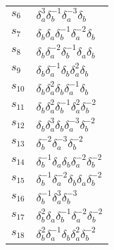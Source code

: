\documentclass{article}
\begin{document}
\begin{center}
\begin{tabular}{ll}
$s_{6}$ & $\delta_a^{3}\delta_b^{-1}\delta_a^{-3}\delta_b^{}$ \\
$s_{7}$ & $\delta_b^{}\delta_a^{}\delta_b^{-1}\delta_a^{-2}\delta_b^{}$ \\
$s_{8}$ & $\delta_b^{}\delta_a^{-2}\delta_b^{-1}\delta_a^{}\delta_b^{}$ \\
$s_{9}$ & $\delta_b^{}\delta_a^{-1}\delta_b^{}\delta_a^{2}\delta_b^{}$ \\
$s_{10}$ & $\delta_b^{}\delta_a^{2}\delta_b^{}\delta_a^{-1}\delta_b^{}$ \\
$s_{11}$ & $\delta_b^{}\delta_a^{2}\delta_b^{-1}\delta_a^{2}\delta_b^{-2}$ \\
$s_{12}$ & $\delta_b^{}\delta_a^{3}\delta_b^{}\delta_a^{-3}\delta_b^{-2}$ \\
$s_{13}$ & $\delta_b^{-2}\delta_a^{-3}\delta_b^{-2}$ \\
$s_{14}$ & $\delta_b^{-1}\delta_a^{}\delta_b^{}\delta_a^{-2}\delta_b^{-2}$ \\
$s_{15}$ & $\delta_b^{-1}\delta_a^{-2}\delta_b^{}\delta_a^{}\delta_b^{-2}$ \\
$s_{16}$ & $\delta_b^{-1}\delta_a^{3}\delta_b^{-3}$ \\
$s_{17}$ & $\delta_b^{2}\delta_a^{}\delta_b^{-1}\delta_a^{-2}\delta_b^{-2}$ \\
$s_{18}$ & $\delta_b^{2}\delta_a^{-1}\delta_b^{}\delta_a^{2}\delta_b^{-2}$ \\
\bottomrule
\end{tabular}
\end{center}

\thispagestyle{empty}
\end{document}
